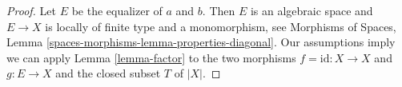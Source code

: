 \documentclass[10pt,a4paper]{amsart}
\theoremstyle{plain}
\theoremstyle{definition}
\theoremstyle{remark}
\numberwithin{equation}{subsection}
\begin{document}
\begin{proof}
Let $E$ be the equalizer of $a$ and $b$. Then $E$ is an algebraic space
and $E \to X$ is locally of finite type and a monomorphism, see
Morphisms of Spaces, Lemma \ref{spaces-morphisms-lemma-properties-diagonal}.
Our assumptions imply we can apply Lemma \ref{lemma-factor} to the two
morphisms $f = \text{id} : X \to X$ and $g : E \to X$ and the closed
subset $T$ of $|X|$.
\end{proof}
\end{document}
